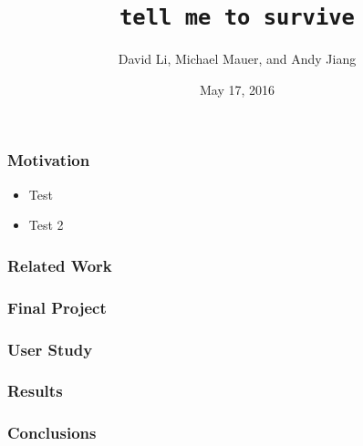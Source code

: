 \documentclass{beamer}
\title{\texttt{tell me to survive}}
\author{David Li, Michael Mauer, and Andy Jiang}
\institute{Cornell University}
\date{May 17, 2016}
\begin{document}
\frame{\titlepage}

\begin{frame}
\frametitle{Motivation}

\begin{itemize}[<+->]
\item Test
\item Test 2
\end{itemize}
\end{frame}

\begin{frame}
\frametitle{Related Work}
\end{frame}

\begin{frame}
\frametitle{Final Project}
\end{frame}

\begin{frame}
\frametitle{User Study}
\end{frame}

\begin{frame}
\frametitle{Results}
\end{frame}

\begin{frame}
\frametitle{Conclusions}
\end{frame}
\end{document}
